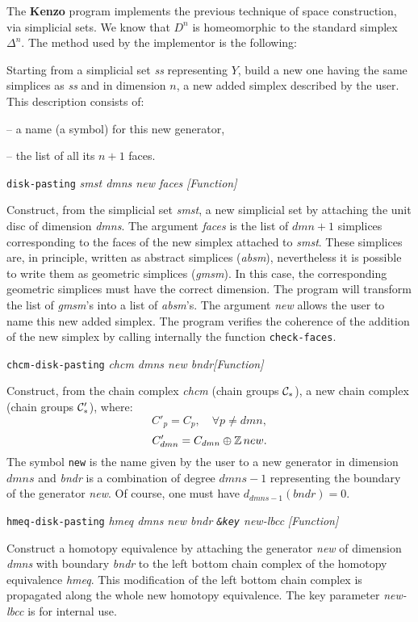 The {\bf Kenzo} program implements the previous technique of  space construction, via simplicial sets.
We know that $D^n$ is homeomorphic to the standard simplex $\Delta^n$. The method used
by the implementor is the following:
\par
Starting from a simplicial set {\em ss} representing $Y$, build a new one having the same simplices
as {\em ss} and in dimension $n$, a new added simplex described by the user. This description
consists of: \par
-- a name (a symbol) for this new generator,\par
-- the list of all its $n+1$ faces.
\newpage
{\parindent=0mm
{\leftskip=5mm
{\tt disk-pasting} {\em smst dmns new faces }\hfill{\em [Function]} \par}
{\leftskip=15mm
Construct, from the  simplicial set  {\em smst}, a new simplicial set
by attaching the unit disc of dimension {\em dmns}. The argument {\em faces} is the
list of  $dmn+1$  simplices corresponding to the faces of the new simplex
attached to {\em smst}. These simplices are, in principle, written as abstract simplices
({\em absm}), nevertheless it is possible to write them as geometric simplices ({\em gmsm}). In this case,
the corresponding geometric simplices must have the correct dimension. The program will transform the list of
{\em gmsm}'s into a list of {\em absm}'s.  The argument {\em new} allows the user to name this new added simplex.
The program verifies the coherence of the addition of the new simplex by calling internally the function
{\tt check-faces}.
\par}
{\leftskip=5mm
{\tt chcm-disk-pasting} {\em chcm dmns new  bndr}\hfill{\em [Function]} \par}
{\leftskip=15mm
Construct, from the chain complex  {\em chcm} (chain groups ${\cal C}_*$), a new chain complex
(chain groups ${\cal C}_*'$), where:
$$C'_p=C_p,\quad \forall p \not= dmn,$$
$$C'_{dmn}= C_{dmn} \oplus {\mathbb{Z}}\, new.$$
The symbol {\tt new} is the name given by the user to a new generator in dimension $dmns$ and
{\em bndr} is a combination of degree $dmns-1$ representing the  boundary of the
generator {\em new}. Of course, one must have $d_{dmns-1}(bndr)=0.$ \par}
{\leftskip=5mm
{\tt hmeq-disk-pasting} {\em hmeq dmns new bndr {\tt \&key} new-lbcc } \hfill{\em [Function]}\par}
{\leftskip=15mm
Construct a homotopy equivalence by attaching  the  generator {\em new} of dimension {\em dmns}
with boundary {\em bndr} to the left bottom chain complex of the homotopy equivalence {\em hmeq}.
This modification of the left bottom chain complex is propagated along the whole new homotopy equivalence.
The key parameter {\em new-lbcc} is for internal use.
\par}
}

